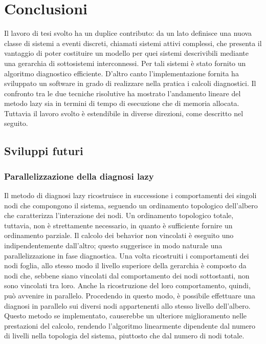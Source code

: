 \chapter{Conclusioni}
Il lavoro di tesi svolto ha un duplice contributo: da un lato definisce una nuova classe di sistemi a eventi discreti, chiamati sistemi attivi complessi, che presenta il vantaggio di poter costituire un modello per quei sistemi descrivibili mediante una gerarchia di sottosistemi interconnessi. Per tali sistemi è stato fornito un algoritmo diagnostico efficiente. D'altro canto l'implementazione fornita ha sviluppato un software in grado di realizzare nella pratica i calcoli diagnostici. Il confronto tra le due tecniche risolutive ha mostrato l'andamento lineare del metodo lazy sia in termini di tempo di esecuzione che di memoria allocata. Tuttavia il lavoro svolto è estendibile in diverse direzioni, come descritto nel seguito.

\section{Sviluppi futuri}

\subsection{Parallelizzazione della diagnosi lazy}
Il metodo di diagnosi lazy ricostruisce in successione i comportamenti dei singoli nodi che compongono il sistema, seguendo un ordinamento topologico dell'albero che caratterizza l'interazione dei nodi. Un ordinamento topologico totale, tuttavia, non è strettamente necessario, in quanto è sufficiente fornire un ordinamento parziale. Il calcolo dei behavior non vincolati è eseguito uno indipendentemente dall'altro; questo suggerisce in modo naturale una parallelizzazione in fase diagnostica. Una volta ricostruiti i comportamenti dei nodi foglia, allo stesso modo il livello superiore della gerarchia è composto da nodi che, sebbene siano vincolati dal comportamento dei nodi sottostanti, non sono vincolati tra loro. Anche la ricostruzione del loro comportamento, quindi, può avvenire in parallelo. Procedendo in questo modo, è possibile effettuare una diagnosi in parallelo sui diversi nodi appartenenti allo stesso livello dell'albero. Questo metodo se implementato, causerebbe un ulteriore miglioramento nelle prestazioni del calcolo, rendendo l'algoritmo linearmente dipendente dal numero di livelli nella topologia del sistema, piuttosto che dal numero di nodi totale. 

